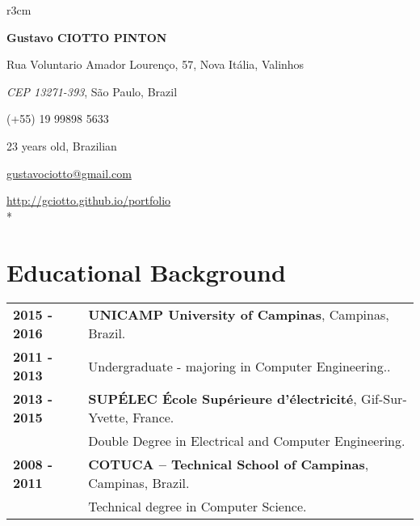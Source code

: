 \documentclass[10pt, a4paper]{article}
\author{Gustavo Ciotto Pinton}
\begin{document}
\pagestyle{empty} 

\begin{wrapfigure}{r}{3cm}
  \vspace{-20pt}
  \begin{center}
  \end{center}
\end{wrapfigure}

\textbf{\LARGE Gustavo CIOTTO PINTON}

Rua Voluntario Amador Lourenço, 57, Nova Itália, Valinhos

\textit{CEP 13271-393}, São Paulo, Brazil

(+55) 19 99898 5633	

23 years old, Brazilian

\url{gustavociotto@gmail.com} 

\url{http://gciotto.github.io/portfolio}\\*



\section{Educational Background}

\begin{tabular}{p{} p{}}

 \textbf{2015 - 2016} & \textbf{UNICAMP University of
 Campinas}, Campinas, Brazil.
 \\
 \textbf{2011 - 2013} & Undergraduate -  majoring in
 Computer Engineering..\vspace{8pt}
 \\ 

 \textbf{2013 - 2015} & \textbf{SUPÉLEC  École Supérieure d'électricité},
 Gif-Sur-Yvette, France. \\
 & Double Degree in Electrical and Computer Engineering. \vspace{8pt}\\

 
 \textbf{2008 - 2011} & \textbf{COTUCA – Technical School of Campinas},
 Campinas, Brazil. \\
 & Technical degree in Computer Science. \\
\end{tabular}
\end{document}
